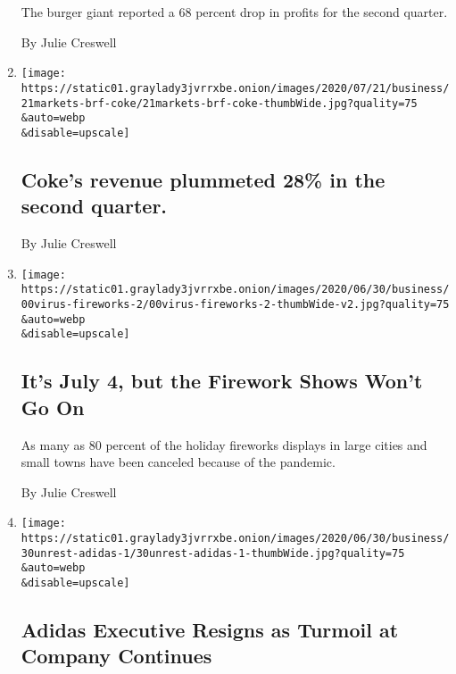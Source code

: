 \begin{enumerate}
  The burger giant reported a 68 percent drop in profits for the second
  quarter.

  By Julie Creswell
\item
  \href{/live/2020/07/21/business/stock-market-today-coronavirus/cokes-revenue-plummeted-28-in-the-second-quarter}{}

  \texttt{[image: https://static01.graylady3jvrrxbe.onion/images/2020/07/21/business/21markets-brf-coke/21markets-brf-coke-thumbWide.jpg?quality=75\\\&auto=webp\\\&disable=upscale]}

  \hypertarget{cokes-revenue-plummeted-28-in-the-second-quarter}{%
  \subsection{Coke's revenue plummeted 28\% in the second
  quarter.}\label{cokes-revenue-plummeted-28-in-the-second-quarter}}

  By Julie Creswell
\item
  \href{/2020/07/01/business/fourth-of-july-fireworks-displays.html}{}

  \texttt{[image: https://static01.graylady3jvrrxbe.onion/images/2020/06/30/business/00virus-fireworks-2/00virus-fireworks-2-thumbWide-v2.jpg?quality=75\\\&auto=webp\\\&disable=upscale]}

  \hypertarget{its-july-4-but-the-firework-shows-wont-go-on}{%
  \subsection{It's July 4, but the Firework Shows Won't Go
  On}\label{its-july-4-but-the-firework-shows-wont-go-on}}

  As many as 80 percent of the holiday fireworks displays in large
  cities and small towns have been canceled because of the pandemic.

  By Julie Creswell
\item
  \href{/2020/06/30/business/adidas-karen-parkin-resigns.html}{}

  \texttt{[image: https://static01.graylady3jvrrxbe.onion/images/2020/06/30/business/30unrest-adidas-1/30unrest-adidas-1-thumbWide.jpg?quality=75\\\&auto=webp\\\&disable=upscale]}

  \hypertarget{adidas-executive-resigns-as-turmoil-at-company-continues}{%
  \subsection{Adidas Executive Resigns as Turmoil at Company
  Continues}\label{adidas-executive-resigns-as-turmoil-at-company-continues}}


\end{enumerate}
